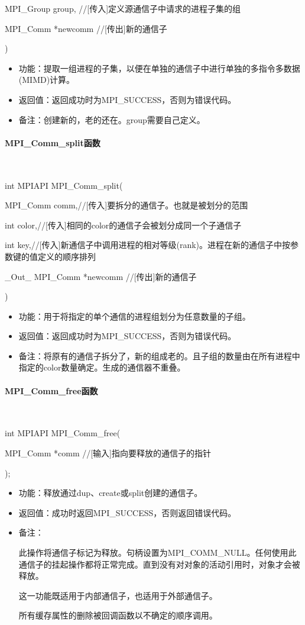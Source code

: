 \documentclass[UTF8]{article}%
\begin{document}
    \qquad MPI\_Group group, //[传入]定义源通信子中请求的进程子集的组

    \qquad MPI\_Comm *newcomm //[传出]新的通信子
    
    )

\begin{itemize}
    \item 功能：提取一组进程的子集，以便在单独的通信子中进行单独的多指令多数据(MIMD)计算。
    \item 返回值：返回成功时为MPI\_SUCCESS，否则为错误代码。
    \item 备注：创建新的，老的还在。group需要自己定义。
\end{itemize}

\paragraph{MPI\_Comm\_split函数}~{}

int MPIAPI MPI\_Comm\_split(

    \qquad MPI\_Comm comm,//[传入]要拆分的通信子。也就是被划分的范围

    \qquad int color,//[传入]相同的color的通信子会被划分成同一个子通信子

    \qquad int key,//[传入]新通信子中调用进程的相对等级(rank)。进程在新的通信子中按参数键的值定义的顺序排列
    
    \qquad \_Out\_ MPI\_Comm *newcomm //[传出]新的通信子

    )

\begin{itemize}
    \item 功能：用于将指定的单个通信的进程组划分为任意数量的子组。
    \item 返回值：返回成功时为MPI\_SUCCESS，否则为错误代码。
    \item 备注：将原有的通信子拆分了，新的组成老的。且子组的数量由在所有进程中指定的color数量确定。生成的通信器不重叠。
\end{itemize}

\paragraph{MPI\_Comm\_free函数}~{}

int MPIAPI MPI\_Comm\_free(
    
    \qquad MPI\_Comm *comm //[输入]指向要释放的通信子的指针

);

\begin{itemize}
    \item 功能：释放通过dup、create或split创建的通信子。
    \item 返回值：成功时返回MPI\_SUCCESS，否则返回错误代码。
    \item 备注：
    
    此操作将通信子标记为释放。句柄设置为MPI\_COMM\_NULL。任何使用此通信子的挂起操作都将正常完成。直到没有对对象的活动引用时，对象才会被释放。

    这一功能既适用于内部通信子，也适用于外部通信子。
    
    所有缓存属性的删除被回调函数以不确定的顺序调用。

\end{itemize}
\end{document}
